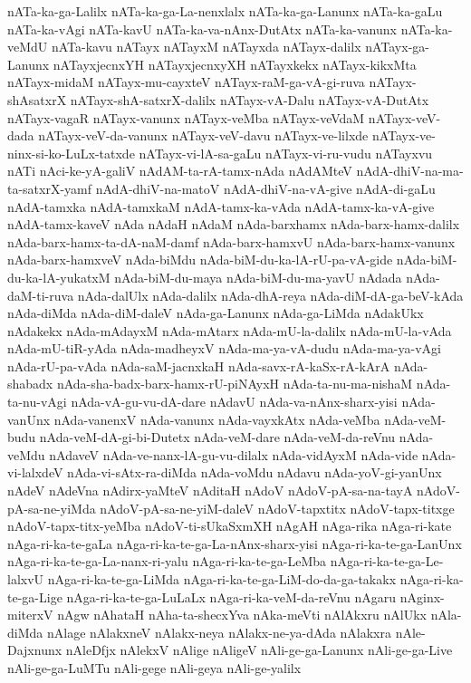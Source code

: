 {nATa-ka-ga-Lalilx
nATa-ka-ga-La-nenxlalx
nATa-ka-ga-Lanunx
nATa-ka-gaLu
nATa-ka-vAgi
nATa-kavU
nATa-ka-va-nAnx-DutAtx
nATa-ka-vanunx
nATa-ka-veMdU
nATa-kavu
nATayx
nATayxM
nATayxda
nATayx-dalilx
nATayx-ga-Lanunx
nATayxjecnxYH
nATayxjecnxyXH
nATayxkekx
nATayx-kikxMta
nATayx-midaM
nATayx-mu-cayxteV
nATayx-raM-ga-vA-gi-ruva
nATayx-shAsatxrX
nATayx-shA-satxrX-dalilx
nATayx-vA-Dalu
nATayx-vA-DutAtx
nATayx-vagaR
nATayx-vanunx
nATayx-veMba
nATayx-veVdaM
nATayx-veV-dada
nATayx-veV-da-vanunx
nATayx-veV-davu
nATayx-ve-lilxde
nATayx-ve-ninx-si-ko-LuLx-tatxde
nATayx-vi-lA-sa-gaLu
nATayx-vi-ru-vudu
nATayxvu
nATi
nAci-ke-yA-galiV
nAdAM-ta-rA-tamx-nAda
nAdAMteV
nAdA-dhiV-na-ma-ta-satxrX-yamf
nAdA-dhiV-na-matoV
nAdA-dhiV-na-vA-give
nAdA-di-gaLu
nAdA-tamxka
nAdA-tamxkaM
nAdA-tamx-ka-vAda
nAdA-tamx-ka-vA-give
nAdA-tamx-kaveV
nAda
nAdaH
nAdaM
nAda-barxhamx
nAda-barx-hamx-dalilx
nAda-barx-hamx-ta-dA-naM-damf
nAda-barx-hamxvU
nAda-barx-hamx-vanunx
nAda-barx-hamxveV
nAda-biMdu
nAda-biM-du-ka-lA-rU-pa-vA-gide
nAda-biM-du-ka-lA-yukatxM
nAda-biM-du-maya
nAda-biM-du-ma-yavU
nAdada
nAda-daM-ti-ruva
nAda-dalUlx
nAda-dalilx
nAda-dhA-reya
nAda-diM-dA-ga-beV-kAda
nAda-diMda
nAda-diM-daleV
nAda-ga-Lanunx
nAda-ga-LiMda
nAdakUkx
nAdakekx
nAda-mAdayxM
nAda-mAtarx
nAda-mU-la-dalilx
nAda-mU-la-vAda
nAda-mU-tiR-yAda
nAda-madheyxV
nAda-ma-ya-vA-dudu
nAda-ma-ya-vAgi
nAda-rU-pa-vAda
nAda-saM-jacnxkaH
nAda-savx-rA-kaSx-rA-kArA
nAda-shabadx
nAda-sha-badx-barx-hamx-rU-piNAyxH
nAda-ta-nu-ma-nishaM
nAda-ta-nu-vAgi
nAda-vA-gu-vu-dA-dare
nAdavU
nAda-va-nAnx-sharx-yisi
nAda-vanUnx
nAda-vanenxV
nAda-vanunx
nAda-vayxkAtx
nAda-veMba
nAda-veM-budu
nAda-veM-dA-gi-bi-Dutetx
nAda-veM-dare
nAda-veM-da-reVnu
nAda-veMdu
nAdaveV
nAda-ve-nanx-lA-gu-vu-dilalx
nAda-vidAyxM
nAda-vide
nAda-vi-lalxdeV
nAda-vi-sAtx-ra-diMda
nAda-voMdu
nAdavu
nAda-yoV-gi-yanUnx
nAdeV
nAdeVna
nAdirx-yaMteV
nAditaH
nAdoV
nAdoV-pA-sa-na-tayA
nAdoV-pA-sa-ne-yiMda
nAdoV-pA-sa-ne-yiM-daleV
nAdoV-tapxtitx
nAdoV-tapx-titxge
nAdoV-tapx-titx-yeMba
nAdoV-ti-sUkaSxmXH
nAgAH
nAga-rika
nAga-ri-kate
nAga-ri-ka-te-gaLa
nAga-ri-ka-te-ga-La-nAnx-sharx-yisi
nAga-ri-ka-te-ga-LanUnx
nAga-ri-ka-te-ga-La-nanx-ri-yalu
nAga-ri-ka-te-ga-LeMba
nAga-ri-ka-te-ga-Le-lalxvU
nAga-ri-ka-te-ga-LiMda
nAga-ri-ka-te-ga-LiM-do-da-ga-takakx
nAga-ri-ka-te-ga-Lige
nAga-ri-ka-te-ga-LuLaLx
nAga-ri-ka-veM-da-reVnu
nAgaru
nAginx-miterxV
nAgw
nAhataH
nAha-ta-shecxYva
nAka-meVti
nAlAkxru
nAlUkx
nAla-diMda
nAlage
nAlakxneV
nAlakx-neya
nAlakx-ne-ya-dAda
nAlakxra
nAle-Dajxnunx
nAleDfjx
nAlekxV
nAlige
nAligeV
nAli-ge-ga-Lanunx
nAli-ge-ga-Live
nAli-ge-ga-LuMTu
nAli-gege
nAli-geya
nAli-ge-yalilx
}
